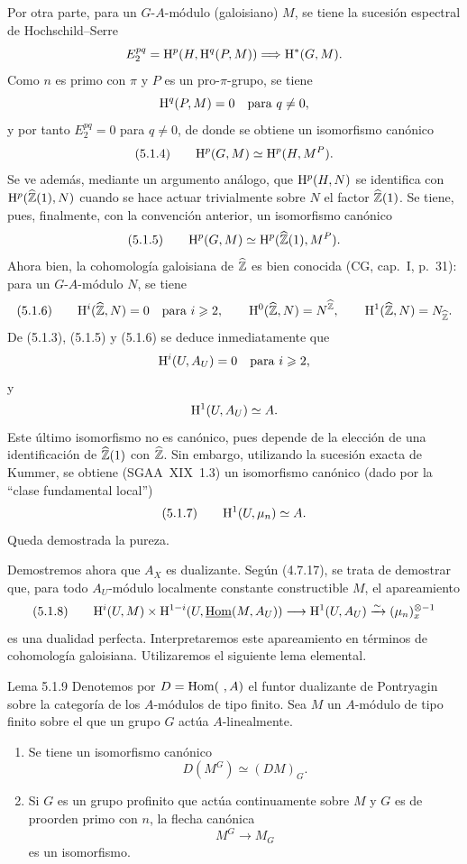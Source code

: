 \begin{prooftext}[Demostración]
Por otra parte, para un $G$-$A$-módulo (galoisiano) $M$, se tiene la sucesión espectral de Hochschild--Serre
\[
E_2^{pq}=\mathrm{H}^p(H,\mathrm{H}^q(P,M))\Longrightarrow \mathrm{H}^{*}(G,M).
\]
Como $n$ es primo con $\pi$ y $P$ es un pro-$\pi$-grupo, se tiene
\[
\mathrm{H}^q(P,M)=0\quad\text{para }q\ne0,
\]
y por tanto $E_2^{pq}=0$ para $q\ne0$, de donde se obtiene un isomorfismo canónico
\[
(5.1.4)\qquad \mathrm{H}^p(G,M)\simeq \mathrm{H}^p(H,M^P).
\]
Se ve además, mediante un argumento análogo, que $\mathrm{H}^p(H,N)$ se identifica con $\mathrm{H}^p(\widehat{\mathbb{Z}}(1),N)$ cuando se hace actuar trivialmente sobre $N$ el factor $\widehat{\mathbb{Z}}(1)$. Se tiene, pues, finalmente, con la convención anterior, un isomorfismo canónico
\[
(5.1.5)\qquad \mathrm{H}^p(G,M)\simeq \mathrm{H}^p(\widehat{\mathbb{Z}}(1),M^P).
\]
Ahora bien, la cohomología galoisiana de $\widehat{\mathbb{Z}}$ es bien conocida (CG, cap.~I, p.~31): para un $G$-$A$-módulo $N$, se tiene
\[
(5.1.6)\qquad
\mathrm{H}^i(\widehat{\mathbb{Z}},N)=0\quad\text{para }i\geqslant2,
\qquad
\mathrm{H}^0(\widehat{\mathbb{Z}},N)=N^{\widehat{\mathbb{Z}}},
\qquad
\mathrm{H}^1(\widehat{\mathbb{Z}},N)=N_{\widehat{\mathbb{Z}}}.
\]
De (5.1.3), (5.1.5) y (5.1.6) se deduce inmediatamente que
\[
\mathrm{H}^i(U,A_U)=0\quad\text{para }i\geqslant2,
\]
y
\[
\mathrm{H}^1(U,A_U)\simeq A.
\]
Este último isomorfismo no es canónico, pues depende de la elección de una identificación de $\widehat{\mathbb{Z}}(1)$ con $\widehat{\mathbb{Z}}$. Sin embargo, utilizando la sucesión exacta de Kummer, se obtiene (SGAA~XIX~1.3) un isomorfismo canónico (dado por la \textquotedblleft clase fundamental local\textquotedblright{})
\[
(5.1.7)\qquad \mathrm{H}^1(U,\mu_n)\simeq A.
\]
Queda demostrada la pureza.

Demostremos ahora que $A_X$ es dualizante. Según (4.7.17), se trata de demostrar que, para todo $A_U$-módulo localmente constante constructible $M$, el apareamiento
\[
(5.1.8)\qquad \mathrm{H}^i(U,M)\times\mathrm{H}^{1-i}(U,\underline{\operatorname{Hom}}(M,A_U))\longrightarrow \mathrm{H}^1(U,A_U)\xrightarrow{\sim}(\mu_n)_x^{\otimes -1}
\]
es una dualidad perfecta. Interpretaremos este apareamiento en términos de cohomología galoisiana. Utilizaremos el siguiente lema elemental.
\end{prooftext}

\begin{statement}{Lema 5.1.9}
Denotemos por $D=\operatorname{Hom}(\ ,A)$ el funtor dualizante de Pontryagin sobre la categoría de los $A$-módulos de tipo finito. Sea $M$ un $A$-módulo de tipo finito sobre el que un grupo $G$ actúa $A$-linealmente.
\begin{enumerate}[label=(\roman*)]
\item Se tiene un isomorfismo canónico
\[
D(M^G)\simeq (DM)_G.
\]
\item Si $G$ es un grupo profinito que actúa continuamente sobre $M$ y $G$ es de proorden primo con $n$, la flecha canónica
\[
M^G\longrightarrow M_G
\]
es un isomorfismo.
\end{enumerate}
\end{statement}

